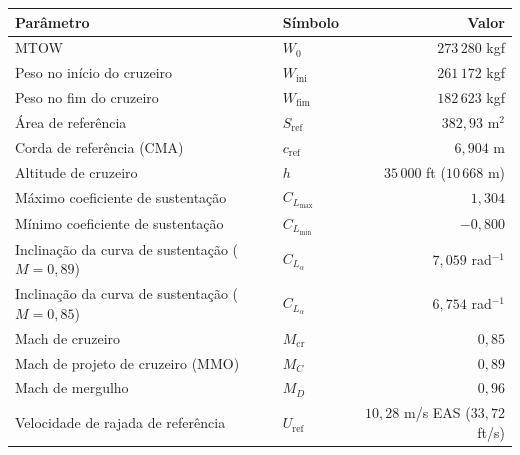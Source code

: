 \begin{tabular}{llr}
\toprule
Parâmetro & Símbolo & Valor \\
\midrule
MTOW & $W_0$ & $273\,280$ kgf \\
Peso no início do cruzeiro & $W_{\mathrm{ini}}$ & $261\,172$ kgf \\
Peso no fim do cruzeiro & $W_{\mathrm{fim}}$ & $182\,623$ kgf \\
Área de referência & $S_{\mathrm{ref}}$ & $382{,}93$ m$^2$ \\
Corda de referência (CMA) & $c_{\mathrm{ref}}$ & $6{,}904$ m \\
Altitude de cruzeiro & $h$ & $35\,000$ ft ($10\,668$ m) \\
Máximo coeficiente de sustentação & $C_{L_{\max}}$ & $1{,}304$ \\
Mínimo coeficiente de sustentação & $C_{L_{\min}}$ & $-0{,}800$ \\
Inclinação da curva de sustentação ($M = 0{,}89$) & $C_{L_\alpha}$ & $7{,}059$ rad$^{-1}$ \\
Inclinação da curva de sustentação ($M = 0{,}85$) & $C_{L_\alpha}$ & $6{,}754$ rad$^{-1}$ \\
Mach de cruzeiro & $M_{\mathrm{cr}}$ & $0{,}85$ \\
Mach de projeto de cruzeiro (MMO) & $M_C$ & $0{,}89$ \\
Mach de mergulho & $M_D$ & $0{,}96$ \\
Velocidade de rajada de referência & $U_{\mathrm{ref}}$ & $10{,}28$ m/s EAS ($33{,}72$ ft/s) \\
\bottomrule
\end{tabular}
